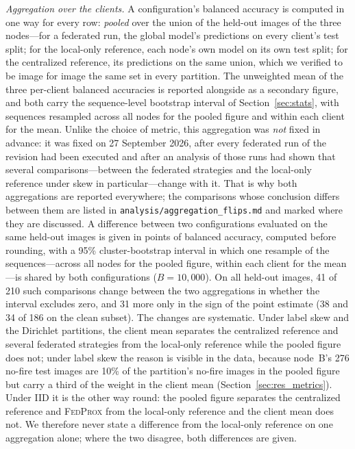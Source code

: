 \documentclass[journal]{IEEEtran}
\newcommand{\fedprox}{\textsc{FedProx}}
\begin{document}
\emph{Aggregation over the clients.} A configuration's balanced accuracy is computed in one way for every row: \emph{pooled} over the union of the held-out images of the three nodes---for a federated run, the global model's predictions on every client's test split; for the local-only reference, each node's own model on its own test split; for the centralized reference, its predictions on the same union, which we verified to be image for image the same set in every partition. The unweighted mean of the three per-client balanced accuracies is reported alongside as a secondary figure, and both carry the sequence-level bootstrap interval of Section~\ref{sec:stats}, with sequences resampled across all nodes for the pooled figure and within each client for the mean. Unlike the choice of metric, this aggregation was \emph{not} fixed in advance: it was fixed on 27 September 2026, after every federated run of the revision had been executed and after an analysis of those runs had shown that several comparisons---between the federated strategies and the local-only reference under skew in particular---change with it. That is why both aggregations are reported everywhere; the comparisons whose conclusion differs between them are listed in \texttt{analysis/aggregation\_flips.md} and marked where they are discussed. A difference between two configurations evaluated on the same held-out images is given in points of balanced accuracy, computed before rounding, with a 95\% cluster-bootstrap interval in which one resample of the sequences---across all nodes for the pooled figure, within each client for the mean---is shared by both configurations ($B=10{,}000$). On all held-out images, 41 of 210 such comparisons change between the two aggregations in whether the interval excludes zero, and 31 more only in the sign of the point estimate (38 and 34 of 186 on the clean subset). The changes are systematic. Under label skew and the Dirichlet partitions, the client mean separates the centralized reference and several federated strategies from the local-only reference while the pooled figure does not; under label skew the reason is visible in the data, because node~B's 276 no-fire test images are 10\% of the partition's no-fire images in the pooled figure but carry a third of the weight in the client mean (Section~\ref{sec:res_metrics}). Under IID it is the other way round: the pooled figure separates the centralized reference and \fedprox{} from the local-only reference and the client mean does not. We therefore never state a difference from the local-only reference on one aggregation alone; where the two disagree, both differences are given.
\end{document}

